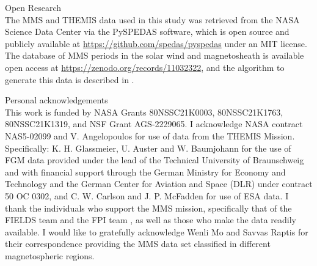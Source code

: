 Open Research \\

The MMS and THEMIS data \citep{Torbert:2016,Pollock:2016} used in this study was retrieved from the NASA Science Data Center via the PySPEDAS software, which is open source and publicly available at \url{https://github.com/spedas/pyspedas} under an MIT license. The \cite{ToyEdens:2024} database of MMS periods in the solar wind and magnetosheath is available open access at \url{https://zenodo.org/records/11032322}, and the algorithm to generate this data is described in \cite{ToyEdens2:2024}.

Personal acknowledgements \\

This work is funded by NASA Grants 80NSSC21K0003, 80NSSC21K1763, 80NSSC21K1319, and NSF Grant AGS‐2229065. I acknowledge NASA contract NAS5-02099 and V. Angelopoulos for use of data from the THEMIS Mission. Specifically: K. H. Glassmeier, U. Auster and W. Baumjohann for the use of FGM data \citep{Auster:2008} provided under the lead of the Technical University of Braunschweig and with financial support through the German Ministry for Economy and Technology and the German Center for Aviation and Space (DLR) under contract 50 OC 0302, and C. W. Carlson and J. P. McFadden for use of ESA \citep{McFadden:2008} data. I thank the individuals who support the MMS mission, specifically that of the FIELDS team \citep{Torbert:2016} and the FPI team \citep{Pollock:2016}, as well as those who make the data readily available. I would like to gratefully acknowledge Wenli Mo and Savvas Raptis for their correspondence providing the MMS data set classified in different magnetospheric regions. 


